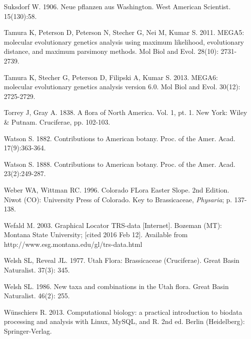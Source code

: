 Suksdorf W. 1906. Neue pflanzen aus Washington. West American Scientist. 15(130):58.

Tamura K, Peterson D, Peterson N, Stecher G, Nei M, Kumar S. 2011. MEGA5: molecular evolutionary genetics analysis using maximum likelihood, evolutionary distance, and maximum parsimony methods. Mol Biol and Evol. 28(10): 2731-2739.

Tamura K, Stecher G, Peterson D, Filipski A, Kumar S. 2013. MEGA6: molecular evolutionary genetics analysis version 6.0. Mol Biol and Evol. 30(12): 2725-2729.

Torrey J, Gray A. 1838. A flora of North America. Vol. 1, pt. 1. New York: Wiley \& Putnam. Cruciferae, pp. 102-103.
  
Watson S. 1882. Contributions to American botany. Proc. of the Amer. Acad. 17(9):363-364.

Watson S. 1888. Contributions to American botany. Proc. of the Amer. Acad. 23(2):249-287.

Weber WA, Wittman RC. 1996. Colorado FLora Easter Slope. 2nd Edition. Niwot (CO): University Press of Colorado. Key to Brassicaceae, \textit{Physaria}; p. 137-138.

Wefald M. 2003. Graphical Locator TRS-data [Internet]. Bozeman (MT): Montana State University; [cited 2016 Feb 12]. Available from http://www.esg.montana.edu/gl/trs-data.html

Welsh SL, Reveal JL. 1977. Utah Flora: Brassicaceae (Cruciferae). Great Basin Naturalist. 37(3): 345.

Welsh SL. 1986. New taxa and combinations in the Utah flora. Great Basin Naturalist. 46(2): 255.

Wünschiers R. 2013. Computational biology: a practical introduction to biodata processing and analysis with Linux, MySQL, and R. 2nd ed. Berlin (Heidelberg): Springer-Verlag.

\setlength{\parindent}{0em}
\setlength{\leftskip}{0em}
\doublespacing
